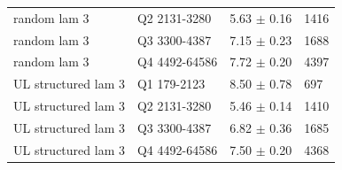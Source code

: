 \begin{tabular}{llll}
random lam 3 & Q2 2131-3280 & 5.63 $\pm$ 0.16 & 1416 \\
random lam 3 & Q3 3300-4387 & 7.15 $\pm$ 0.23 & 1688 \\
random lam 3 & Q4 4492-64586 & 7.72 $\pm$ 0.20 & 4397 \\
UL structured lam 3 & Q1 179-2123 & 8.50 $\pm$ 0.78 & 697 \\
UL structured lam 3 & Q2 2131-3280 & 5.46 $\pm$ 0.14 & 1410 \\
UL structured lam 3 & Q3 3300-4387 & 6.82 $\pm$ 0.36 & 1685 \\
UL structured lam 3 & Q4 4492-64586 & 7.50 $\pm$ 0.20 & 4368 \\
\hline
\end{tabular}
